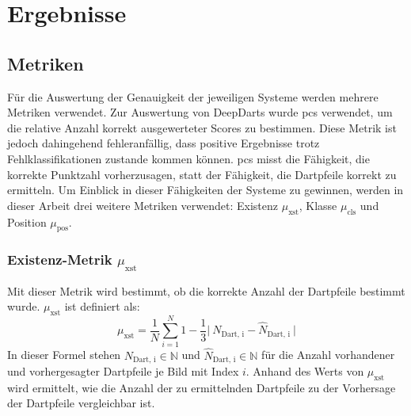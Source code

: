 
\section{Ergebnisse}
\label{sec:ki:ergebnisse}



\subsection{Metriken}
\label{sec:ki_metriken}

Für die Auswertung der Genauigkeit der jeweiligen Systeme werden mehrere Metriken verwendet. Zur Auswertung von DeepDarts wurde \ac{pcs} verwendet, um die relative Anzahl korrekt ausgewerteter Scores zu bestimmen. Diese Metrik ist jedoch dahingehend fehleranfällig, dass positive Ergebnisse trotz Fehlklassifikationen zustande kommen können. \ac{pcs} misst die Fähigkeit, die korrekte Punktzahl vorherzusagen, statt der Fähigkeit, die Dartpfeile korrekt zu ermitteln. Um Einblick in dieser Fähigkeiten der Systeme zu gewinnen, werden in dieser Arbeit drei weitere Metriken verwendet: Existenz $\mu_\text{xst}$, Klasse $\mu_\text{cls}$ und Position $\mu_\text{pos}$.

\subsubsection{Existenz-Metrik $\mu_\text{xst}$}

Mit dieser Metrik wird bestimmt, ob die korrekte Anzahl der Dartpfeile bestimmt wurde. $\mu_\text{xst}$ ist definiert als:
\begin{equation*}
    \mu_\text{xst} = \frac{1}{N} \sum_{i=1}^{N}1 - \frac{1}{3} \vert~N_\text{Dart, i} - \widehat{N}_\text{Dart, i}~\vert
\end{equation*}
In dieser Formel stehen $N_\text{Dart, i} \in \mathbb{N}$ und $\widehat{N}_\text{Dart, i} \in \mathbb{N}$ für die Anzahl vorhandener und vorhergesagter Dartpfeile je Bild mit Index $i$. Anhand des Werts von $\mu_\text{xst}$ wird ermittelt, wie die Anzahl der zu ermittelnden Dartpfeile zu der Vorhersage der Dartpfeile vergleichbar ist.

